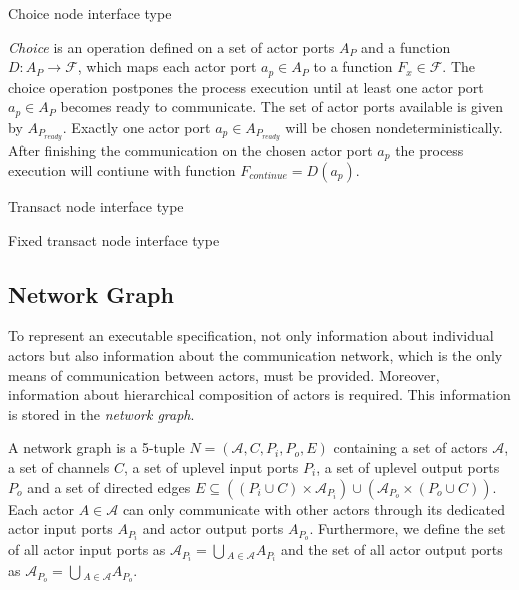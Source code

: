 \begin{definition}\label{choice-node-interface-type}
  Choice node interface type

  \emph{Choice} is an operation defined on a set of actor ports $A_{P}$
  and a function $D: A_{P} \to \mathcal{F}$, which maps each actor port
  $a_{p} \in A_{P}$ to a function $F_{x} \in \mathcal{F}$.
  The choice operation postpones the process execution 
  until at least one actor port $a_{p} \in A_{P}$
  becomes ready to communicate. The set of actor ports available
  is given by $A_{P_{ready}}$.
  Exactly one actor port $a_{p} \in A_{P_{ready}}$
  will be chosen nondeterministically. After
  finishing the communication on the chosen actor port $a_{p}$
  the process execution will contiune
  with function $F_{continue} = D(a_{p})$.
\end{definition}

\begin{definition}\label{transact-node-interface-type}
  Transact node interface type
\end{definition}

\begin{definition}\label{fixed-transact-node-interface-type}
  Fixed transact node interface type
\end{definition}

\subsection{Network Graph}\label{network-graph} 

To represent an executable specification, not only information about
individual actors but also information about the communication network,
which is the only means of communication between actors,
must be provided. Moreover, information about hierarchical
composition of actors is required. This information is stored in
the \emph{network graph}.

\begin{definition}
A network graph is a 5-tuple $N=(\mathcal{A},C,P_{i},P_{o},E)$ containing
a set of actors $\mathcal{A}$, a set of channels $C$, a set of uplevel
input ports $P_{i}$, a set of uplevel output ports $P_{o}$ and a set of
directed edges $E \subseteq ((P_{i} \cup C) \times \mathcal{A}_{P_{i}})
\cup (\mathcal{A}_{P_{o}} \times (P_{o} \cup C))$.
Each actor $A \in \mathcal{A}$ can only communicate with other actors
through its dedicated actor input ports $A_{P_{i}}$ and
actor output ports $A_{P_{o}}$.
Furthermore, we define the set of all
actor input ports as $\mathcal{A}_{P_{i}} = \bigcup{}_{A \in \mathcal{A}} A_{P_{i}}$ and
the set of all actor output ports as
$\mathcal{A}_{P_{o}} = \bigcup{}_{A \in \mathcal{A}} A_{P_{o}}$.
\end{definition}

